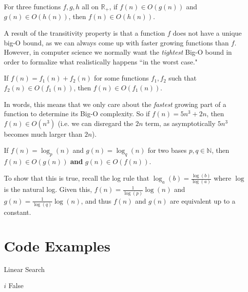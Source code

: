 \begin{flex}
    \begin{definition}[Transitivity]\label{def:bigO::trans}
    For three functions $f, g, h$ all on $\mathbb{R}_+$, if $f(n) \in O(g(n))$ and $g(n) \in O(h(n))$, then $f(n) \in O(h(n))$.
\end{definition}

A result of the transitivity property is that a function $f$ does not have a unique big-O bound, as we can always come up with faster growing functions than $f$. However, in computer science we normally want the \emph{tightest} Big-O bound in order to formalize what realistically happens ``in the worst case."
\end{flex}


\begin{flex}
    \begin{definition}\label{def:bigO::loa}
    If $f(n) = f_1(n) + f_2(n)$ for some functions $f_1, f_2$ such that $f_2(n) \in O(f_1(n))$, then $f(n) \in O(f_1(n))$.
\end{definition}

In words, this means that we only care about the \emph{fastest} growing part of a function to determine its Big-O complexity. So if $f(n) = 5n^3 + 2n$, then $f(n) \in O(n^3)$ (i.e. we can disregard the $2n$ term, as asymptotically $5n^3$ becomes much larger than $2n$).
\end{flex}

\begin{flex}
    \begin{definition}\label{def:bigO::le}
    If $f(n) = \log_p(n)$ and $g(n) = \log_q(n)$ for two bases $p, q \in \mathbb{N}$, then $f(n) \in O(g(n))$ \textbf{and} $g(n) \in O(f(n))$.
\end{definition}

To show that this is true, recall the log rule that $\log_a(b) = \frac{\log(b)}{\log(a)}$ where $\log$ is the natural log. Given this, $f(n) = \frac{1}{\log(p)}\log(n)$ and $g(n) = \frac{1}{\log(q)}\log(n)$, and thus $f(n)$ and $g(n)$ are equivalent up to a constant.
\end{flex}


\section{Code Examples}

\begin{algorithm}[H]
    \caption{Linear Search}
    \label{alg:linear-search}
    \begin{algorithmic}[1]
             
                \Return $i$          
                \EndIf
            \EndFor
            \Return False
        \EndProcedure
    \end{algorithmic}
\end{algorithm}

